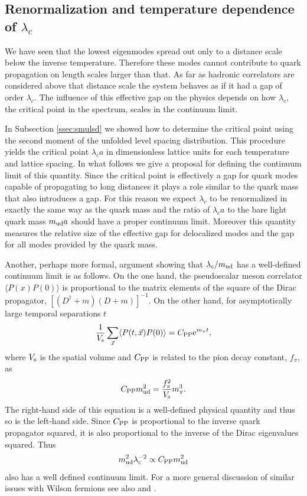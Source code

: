 \documentclass[twocolumn, prd, preprintnumbers, amsmath,
  amssymb, showpacs, floatfix]{revtex4-1}
\newcommand{\msub}[1]{\ensuremath _{\mbox{\scriptsize #1}}}
\begin{document}
\subsection{Renormalization and temperature dependence of $\lambda_c$}

We have seen that the lowest eigenmodes spread out only to a distance scale
below the inverse temperature. Therefore these modes cannot contribute to
quark propagation on length scales larger than that. As far as hadronic
correlators are considered above that distance scale the system behaves as if
it had a gap of order $\lambda_c$. The influence of this effective gap on the
physics depends on how $\lambda_c$, the critical point in the spectrum, scales
in the continuum limit.

In Subsection \ref{ssec:smulsd} we showed how to determine the critical point
using the second moment of the unfolded level spacing distribution. This
procedure yields the critical point $\lambda_c a$ in dimensionless lattice
units for each temperature and lattice spacing. In what follows we give a
proposal for defining the continuum limit of this quantity. Since the critical
point is effectively a gap for quark modes capable of propagating to long
distances it plays a role similar to the quark mass that also introduces a
gap. For this reason we expect $\lambda_c$ to be renormalized in exactly the
same way as the quark mass and the ratio of $\lambda_c a$ to the bare light
quark mass $m\msub{ud} a$ should have a proper continuum limit. Moreover this
quantity measures the relative size of the effective gap for delocalized modes
and the gap for all modes provided by the quark mass.

Another, perhaps more formal, argument showing that $\lambda_c/m\msub{ud}$ has
a well-defined continuum limit is as follows. On the one hand, the
pseudoscalar meson correlator $\langle P(x) P(0) \rangle$ is proportional to
the matrix elements of the square of the Dirac propagator,
$[(D^\dagger+m)(D+m)]^{-1}$. On the other hand, for asymptotically large
temporal separations $t$
\begin{equation}
    \frac{1}{V\msub{s}} \sum_{\vec{x}} \langle P(t,\vec{x}) P(0) \rangle =
    C\msub{PP} \mbox{e}^{m_\pi t},
\end{equation} 
where $V\msub{s}$ is the spatial volume and $C\msub{PP}$ is related to the
pion decay constant, $f_\pi$, as \cite{Aubin:2004fs}
\begin{equation}
   C\msub{PP} m\msub{ud}^2 = \frac{f_\pi^2}{V\msub{s}} m_\pi^3.
\end{equation}
The right-hand side of this equation is a well-defined physical quantity and
thus so is the left-hand side. Since $C\msub{PP}$ is proportional to the
inverse quark propagator squared, it is also proportional to the inverse of
the Dirac eigenvalues squared. Thus
\begin{equation}
 m\msub{ud}^2 \lambda\msub{c}^{-2} \propto C\msub{PP} m\msub{ud}^2
\end{equation}
also has a well defined continuum limit. For a more general discussion of
similar issues with Wilson fermions see also \cite{DelDebbio:2005qa} and
\cite{Giusti:2008vb}.
\end{document}
